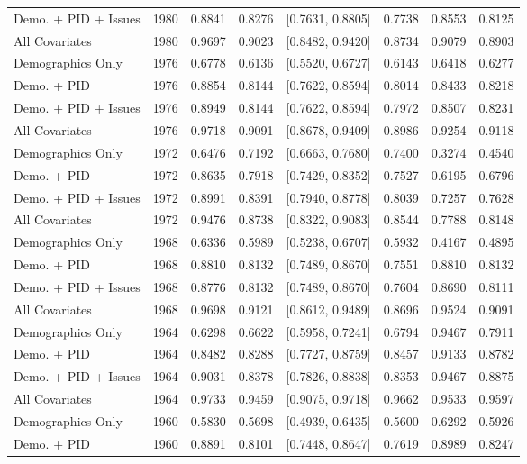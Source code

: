 \begin{longtable}{lrrrlrrr}
  Demo. + PID + Issues & 1980 & 0.8841 & 0.8276 & [0.7631, 0.8805] & 0.7738 & 0.8553 & 0.8125 \\ 
  All Covariates & 1980 & 0.9697 & 0.9023 & [0.8482, 0.9420] & 0.8734 & 0.9079 & 0.8903 \\ 
  Demographics Only & 1976 & 0.6778 & 0.6136 & [0.5520, 0.6727] & 0.6143 & 0.6418 & 0.6277 \\ 
  Demo. + PID & 1976 & 0.8854 & 0.8144 & [0.7622, 0.8594] & 0.8014 & 0.8433 & 0.8218 \\ 
  Demo. + PID + Issues & 1976 & 0.8949 & 0.8144 & [0.7622, 0.8594] & 0.7972 & 0.8507 & 0.8231 \\ 
  All Covariates & 1976 & 0.9718 & 0.9091 & [0.8678, 0.9409] & 0.8986 & 0.9254 & 0.9118 \\ 
  Demographics Only & 1972 & 0.6476 & 0.7192 & [0.6663, 0.7680] & 0.7400 & 0.3274 & 0.4540 \\ 
  Demo. + PID & 1972 & 0.8635 & 0.7918 & [0.7429, 0.8352] & 0.7527 & 0.6195 & 0.6796 \\ 
  Demo. + PID + Issues & 1972 & 0.8991 & 0.8391 & [0.7940, 0.8778] & 0.8039 & 0.7257 & 0.7628 \\ 
  All Covariates & 1972 & 0.9476 & 0.8738 & [0.8322, 0.9083] & 0.8544 & 0.7788 & 0.8148 \\ 
  Demographics Only & 1968 & 0.6336 & 0.5989 & [0.5238, 0.6707] & 0.5932 & 0.4167 & 0.4895 \\ 
  Demo. + PID & 1968 & 0.8810 & 0.8132 & [0.7489, 0.8670] & 0.7551 & 0.8810 & 0.8132 \\ 
  Demo. + PID + Issues & 1968 & 0.8776 & 0.8132 & [0.7489, 0.8670] & 0.7604 & 0.8690 & 0.8111 \\ 
  All Covariates & 1968 & 0.9698 & 0.9121 & [0.8612, 0.9489] & 0.8696 & 0.9524 & 0.9091 \\ 
  Demographics Only & 1964 & 0.6298 & 0.6622 & [0.5958, 0.7241] & 0.6794 & 0.9467 & 0.7911 \\ 
  Demo. + PID & 1964 & 0.8482 & 0.8288 & [0.7727, 0.8759] & 0.8457 & 0.9133 & 0.8782 \\ 
  Demo. + PID + Issues & 1964 & 0.9031 & 0.8378 & [0.7826, 0.8838] & 0.8353 & 0.9467 & 0.8875 \\ 
  All Covariates & 1964 & 0.9733 & 0.9459 & [0.9075, 0.9718] & 0.9662 & 0.9533 & 0.9597 \\ 
  Demographics Only & 1960 & 0.5830 & 0.5698 & [0.4939, 0.6435] & 0.5600 & 0.6292 & 0.5926 \\ 
  Demo. + PID & 1960 & 0.8891 & 0.8101 & [0.7448, 0.8647] & 0.7619 & 0.8989 & 0.8247 \\ 

\end{longtable}

